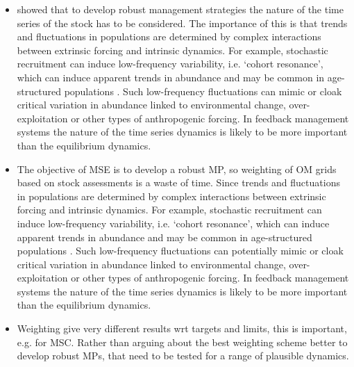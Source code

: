 \begin{itemize}

    \item \cite{fischer2020linking} showed that to develop robust management strategies the nature of the time series of the stock has to be considered. The importance of this is that trends and fluctuations in populations are determined by complex interactions between extrinsic forcing and intrinsic dynamics. For example, stochastic recruitment can induce low-frequency variability, i.e. ‘cohort resonance’, which can induce apparent trends in abundance and may be common in age-structured populations \citep[e.g.][]{bjoernstad2004trends, botsford2014cohort}. Such low-frequency fluctuations can mimic or cloak critical variation in abundance linked to environmental change, over-exploitation or other types of anthropogenic forcing. In feedback management systems the nature of the time series dynamics is likely to be more important than the equilibrium dynamics. 
    
    \item The objective of MSE is to develop a robust MP, so weighting of OM grids based on stock assessments is a waste of time. Since trends and fluctuations in populations are determined by complex interactions between extrinsic forcing and intrinsic dynamics. For example, stochastic recruitment can induce low-frequency variability, i.e. ‘cohort resonance’, which can induce apparent trends in abundance and may be common in age-structured populations \citep[e.g.][]{bjoernstad2004trends, botsford2014cohort}. Such low-frequency fluctuations can potentially mimic or cloak critical variation in abundance linked to environmental change, over-exploitation or other types of anthropogenic forcing. In feedback management systems the nature of the time series dynamics is likely to be more important than the equilibrium dynamics.

   \item Weighting give very different results wrt targets and limits, this is important, e.g. for MSC. Rather than arguing about the best weighting scheme better to develop robust MPs, that need to be tested for a range of plausible dynamics. 
   
\end{itemize} 


